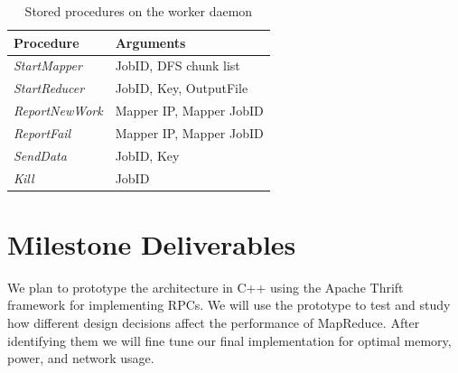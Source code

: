 \documentclass[10pt,letter,final,article,twocolumn]{article} %
\newcommand{\rpc}[1]{\emph{#1}}
\begin{document}
\begin{table}[htdp]
\caption{Stored procedures on the worker daemon}
\begin{center}
\begin{tabular}{|l|l|}\hline
\textbf{Procedure} & \textbf{Arguments}\\\hline
\rpc{StartMapper} & JobID, DFS chunk list \\
\rpc{StartReducer} & JobID, Key, OutputFile \\
\rpc{ReportNewWork} & Mapper IP, Mapper JobID\\
\rpc{ReportFail} & Mapper IP, Mapper JobID\\
\rpc{SendData} & JobID, Key\\
\rpc{Kill} & JobID\\\hline
\end{tabular}
\end{center}
\label{tab:worker_rpc}
\end{table}%



\section{Milestone Deliverables}
We plan to prototype the architecture in C++ using the Apache Thrift framework for implementing RPCs. We will use the prototype to test and study how different design decisions affect the performance of MapReduce. After identifying them we will fine tune our final implementation for optimal memory, power, and network usage.




\end{document}
